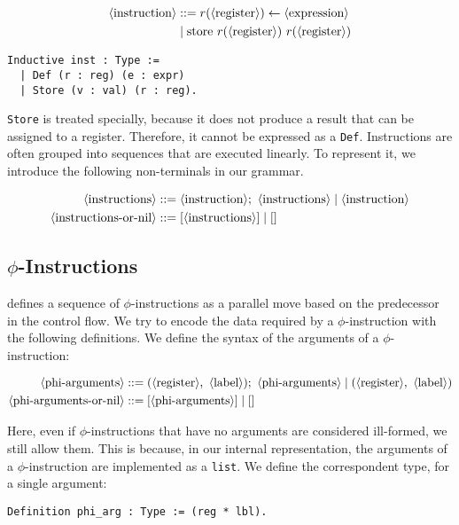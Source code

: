 \begin{align*}
\langle\text{instruction}\rangle &::= r( \langle\text{register}\rangle ) \leftarrow \langle\text{expression}\rangle \\
&\mid \text{store} \ r( \langle\text{register}\rangle ) \ r( \langle\text{register}\rangle )
\end{align*}

\begin{lstlisting}[style=Rocq]
Inductive inst : Type :=
  | Def (r : reg) (e : expr)
  | Store (v : val) (r : reg).
\end{lstlisting}

\texttt{Store} is treated specially, because it does not produce a result that can be assigned to a register. Therefore, it cannot be expressed as a \texttt{Def}.
Instructions are often grouped into sequences that are executed linearly. To represent it, we introduce the following non-terminals in our grammar.

\begin{align*}
\langle\text{instructions}\rangle &::= \langle\text{instruction}\rangle ; \ \langle\text{instructions}\rangle \mid \langle\text{instruction}\rangle \\
\langle\text{instructions-or-nil}\rangle &::= [ \langle\text{instructions}\rangle ] \mid []
\end{align*}

\subsection{$\phi$-Instructions}

 defines a sequence of $\phi$-instructions as a parallel move based on the predecessor in the control flow.
We try to encode the data required by a $\phi$-instruction with the following definitions. We define the syntax of the arguments of a $\phi$-instruction:

\begin{align*}
\nt{phi-arguments} &::= ( \nt{register} , \ \nt{label} ) ; \ \nt{phi-arguments} \mid (\nt{register} , \ \nt{label}) \\
\nt{phi-arguments-or-nil} &::= [ \nt{phi-arguments} ] \mid []
\end{align*}

Here, even if $\phi$-instructions that have no arguments are considered ill-formed, we still allow them. This is because, in our internal representation, the arguments of a $\phi$-instruction are implemented as a \texttt{list}.
We define the correspondent type, for a single argument:

\begin{lstlisting}[style=Rocq]
Definition phi_arg : Type := (reg * lbl).
\end{lstlisting}

